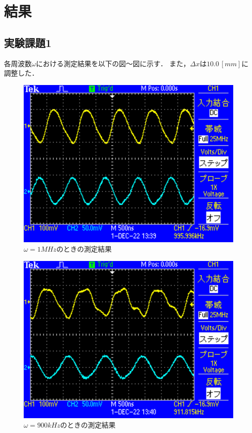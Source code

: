 
\section{結果}

\subsection{実験課題1}
各周波数$\omega$における測定結果を以下の図～図に示す．
また，$\Delta x$は$10.0\,[\si{mm}]$に調整した．

\begin{figure}[H]
    \centering
    \includegraphics[scale=0.5]{TEK0001.pdf}
    \caption{$\omega=1\si{MHz}$のときの測定結果}
\end{figure}

\begin{figure}[H]
    \centering
    \includegraphics[scale=0.5]{TEK0002.pdf}
    \caption{$\omega=900\si{kHz}$のときの測定結果}
\end{figure}

